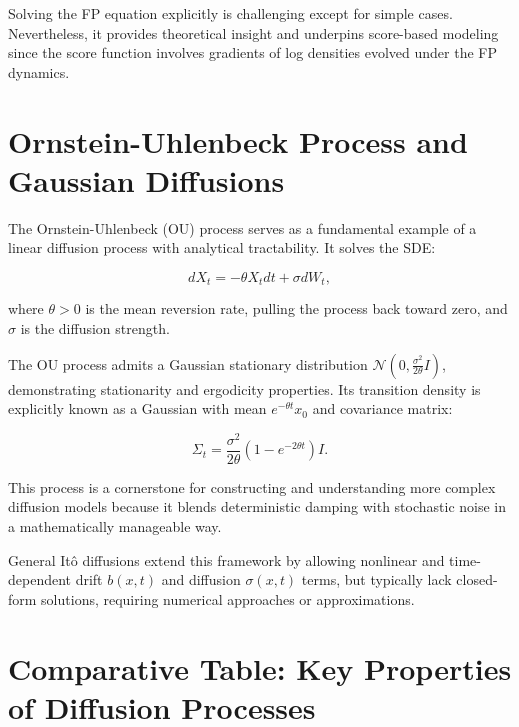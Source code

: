 Solving the FP equation explicitly is challenging except for simple cases. Nevertheless, it provides theoretical insight and underpins score-based modeling since the score function involves gradients of log densities evolved under the FP dynamics.

\section{Ornstein-Uhlenbeck Process and Gaussian Diffusions}

The Ornstein-Uhlenbeck (OU) process serves as a fundamental example of a linear diffusion process with analytical tractability. It solves the SDE:

\[
dX_t = -\theta X_t dt + \sigma dW_t,
\]

where \( \theta > 0 \) is the mean reversion rate, pulling the process back toward zero, and \( \sigma \) is the diffusion strength.

The OU process admits a Gaussian stationary distribution \( \mathcal{N}(0, \frac{\sigma^2}{2\theta} I) \), demonstrating stationarity and ergodicity properties. Its transition density is explicitly known as a Gaussian with mean \( e^{-\theta t} x_0 \) and covariance matrix:

\[
\Sigma_t = \frac{\sigma^2}{2 \theta}(1 - e^{-2\theta t}) I.
\]

This process is a cornerstone for constructing and understanding more complex diffusion models because it blends deterministic damping with stochastic noise in a mathematically manageable way.

General Itô diffusions extend this framework by allowing nonlinear and time-dependent drift \( b(x,t) \) and diffusion \( \sigma(x,t) \) terms, but typically lack closed-form solutions, requiring numerical approaches or approximations.

\section{Comparative Table: Key Properties of Diffusion Processes}

\begin{table}[h]
\centering
{}
\caption{Comparison of classical diffusion processes}
\end{table}

